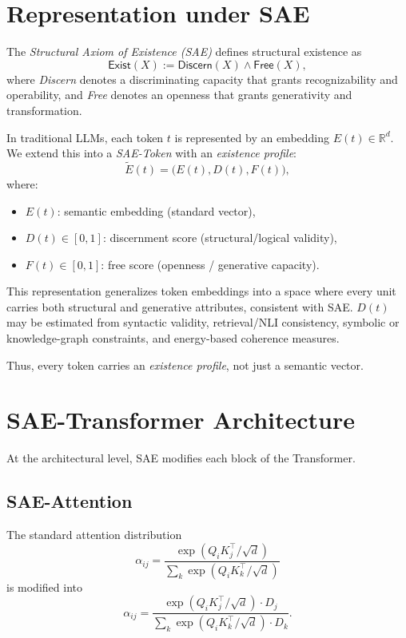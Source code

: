 \documentclass[11pt]{article}
\theoremstyle{plain}
\theoremstyle{definition}
\theoremstyle{remark}
\begin{document}
\section{Representation under SAE}

The \emph{Structural Axiom of Existence (SAE)} defines structural existence as
\[
\mathsf{Exist}(X) := \mathsf{Discern}(X) \wedge \mathsf{Free}(X),
\]
where \emph{Discern} denotes a discriminating capacity that grants recognizability and operability, 
and \emph{Free} denotes an openness that grants generativity and transformation.  

In traditional LLMs, each token $t$ is represented by an embedding $E(t) \in \mathbb{R}^d$.  
We extend this into a \emph{SAE-Token} with an \emph{existence profile}:
\[
\tilde{E}(t) = \big(E(t), D(t), F(t)\big),
\]
where:
\begin{itemize}
  \item $E(t)$: semantic embedding (standard vector),
  \item $D(t) \in [0,1]$: discernment score (structural/logical validity),
  \item $F(t) \in [0,1]$: free score (openness / generative capacity).
\end{itemize}

This representation generalizes token embeddings into a space where every unit carries both structural and generative attributes, consistent with SAE.  
$D(t)$ may be estimated from syntactic validity, retrieval/NLI consistency, symbolic or knowledge-graph constraints, and energy-based coherence measures.  

Thus, every token carries an \emph{existence profile}, not just a semantic vector.

\section{SAE-Transformer Architecture}

At the architectural level, SAE modifies each block of the Transformer.  

\subsection{SAE-Attention}
The standard attention distribution
\[
\alpha_{ij} = \frac{\exp(Q_i K_j^\top / \sqrt{d})}{\sum_k \exp(Q_i K_k^\top / \sqrt{d})}
\]
is modified into
\[
\alpha_{ij} = \frac{\exp(Q_i K_j^\top / \sqrt{d}) \cdot D_j}{\sum_k \exp(Q_i K_k^\top / \sqrt{d}) \cdot D_k}.
\]
\end{document}
